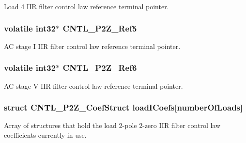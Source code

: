 Load 4 I\-I\-R filter control law reference terminal pointer. \hypertarget{a00014_abd3b240e2d3f7d3f4f717066ee8efd3e}{
\subsubsection[{C\-N\-T\-L\-\_\-2\-P2\-Z\-\_\-\-Ref5}]{\setlength{\rightskip}{0pt plus 5cm}volatile int32$\ast$ C\-N\-T\-L\-\_\-P2\-Z\-\_\-\-Ref5}}\label{a00014_abd3b240e2d3f7d3f4f717066ee8efd3e}
A\-C stage I I\-I\-R filter control law reference terminal pointer. \hypertarget{a00014_a2e5a137088ca653c5642c3bb9cbaec9d}{
\subsubsection[{C\-N\-T\-L\-\_\-2\-P2\-Z\-\_\-\-Ref6}]{\setlength{\rightskip}{0pt plus 5cm}volatile int32$\ast$ C\-N\-T\-L\-\_\-P2\-Z\-\_\-\-Ref6}}\label{a00014_a2e5a137088ca653c5642c3bb9cbaec9d}
A\-C stage V I\-I\-R filter control law reference terminal pointer. \hypertarget{a00014_af15987bb0b6b0819b233fa6963671a35}{
\subsubsection[{load\-I\-Coefs}]{\setlength{\rightskip}{0pt plus 5cm}struct C\-N\-T\-L\-\_\-P2\-Z\-\_\-\-Coef\-Struct load\-I\-Coefs\mbox{[}number\-Of\-Loads\mbox{]}}}\label{a00014_af15987bb0b6b0819b233fa6963671a35}
Array of structures that hold the load 2-\/pole 2-\/zero I\-I\-R filter control law coefficients currently in use. 
